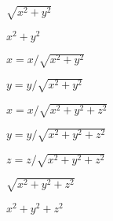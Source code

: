 \documentclass{article}
\begin{document}
$\sqrt{x^2+y^2} $
\pagebreak

$x^2+y^2$
\pagebreak

$x=x/\sqrt{x^2+y^2} $
\pagebreak

$y=y/\sqrt{x^2+y^2} $
\pagebreak

$x=x/\sqrt{x^2+y^2+z^2} $
\pagebreak

$y=y/\sqrt{x^2+y^2+z^2} $
\pagebreak

$z=z/\sqrt{x^2+y^2+z^2} $
\pagebreak

$\sqrt{x^2+y^2+z^2} $
\pagebreak

$x^2+y^2+z^2 $
\pagebreak
\end{document}
